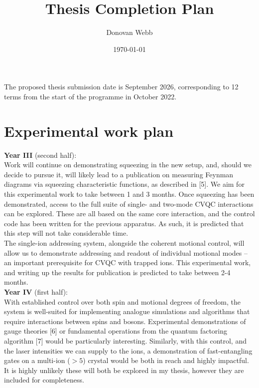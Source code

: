 \documentclass[12pt]{article}
\begin{document}
\title{Thesis Completion Plan}
\author{Donovan Webb}
\date{\today}
\maketitle
\noindent The proposed thesis submission date is September 2026, corresponding to 12 terms from the start of the programme in October 2022.

\section{Experimental work plan}
\noindent \textbf{Year III} (second half): \\
Work will continue on demonstrating squeezing in the new setup, and, should we decide to pursue it, will likely lead to a publication on measuring Feynman diagrams via squeezing characteristic functions, as described in [5]. We aim for this experimental work to take between 1 and 3 months. 
Once squeezing has been demonstrated, access to the full suite of single- and two-mode CVQC interactions can be explored. These are all based on the same core interaction, and the control code has been written for the previous apparatus. As such, it is predicted that this step will not take considerable time.\\
The single-ion addressing system, alongside the coherent motional control, will allow us to demonstrate addressing and readout of individual motional modes -- an important prerequisite for CVQC with trapped ions. This experimental work, and writing up the results for publication is predicted to take between 2-4 months.\\

\noindent \textbf{Year IV} (first half): \\
With established control over both spin and motional degrees of freedom, the system is well-suited for implementing analogue simulations and algorithms that require interactions between spins and bosons. Experimental demonstrations of gauge theories [6] or fundamental operations from the quantum factoring algorithm [7] would be particularly interesting. 
Similarly, with this control, and the laser intensities we can supply to the ions, a demonstration of fast-entangling gates on a multi-ion ($>5$) crystal would be both in reach and highly impactful. \\
It is highly unlikely these will both be explored in my thesis, however they are included for completeness.
\end{document}
